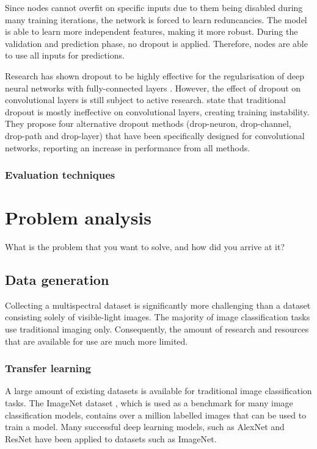 \documentclass{l4proj}
\begin{document}
Since nodes cannot overfit on specific inputs due to them being disabled during many training iterations, the network is forced to learn reduncancies. The model is able to learn more independent features, making it more robust. During the validation and prediction phase, no dropout is applied. Therefore, nodes are able to use all inputs for predictions.

Research has shown dropout to be highly effective for the regularisation of deep neural networks with fully-connected layers \citep{wu_towards_2015}. However, the effect of dropout on convolutional layers is still subject to active research. \citet{cai_effective_2019} state that traditional dropout is mostly ineffective on convolutional layers, creating training instability. They propose four alternative dropout methods (drop-neuron, drop-channel, drop-path and drop-layer) that have been specifically designed for convolutional networks, reporting an increase in performance from all methods. 

\subsection{Evaluation techniques}



\chapter{Problem analysis}
What is the problem that you want to solve, and how did you arrive at it?

\section{Data generation}

Collecting a multispectral dataset is significantly more challenging than a dataset consisting solely of visible-light images. The majority of image classification tasks use traditional imaging only. Consequently, the amount of research and resources that are available for use are much more limited.

\subsection{Transfer learning}

A large amount of existing datasets is available for traditional image classification tasks. The ImageNet dataset \citep{deng_imagenet_2009}, which is used as a benchmark for many image classification models, contains over a million labelled images that can be used to train a model. Many successful deep learning models, such as AlexNet \citep{krizhevsky_imagenet_2012} and ResNet \citep{he_deep_2016} have been applied to datasets such as ImageNet.
\end{document}
